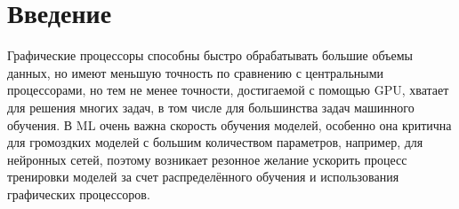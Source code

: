 
\section{Введение}
Графические процессоры способны быстро обрабатывать большие объемы данных, но имеют меньшую точность по сравнению с центральными процессорами, но тем не менее точности, достигаемой с помощью GPU, хватает для решения многих задач, в том числе для большинства задач машинного обучения. В ML очень важна скорость обучения моделей, особенно она критична для громоздких моделей с большим количеством параметров, например, для нейронных сетей, поэтому возникает резонное желание ускорить процесс тренировки моделей за счет распределённого обучения и использования графических процессоров. 
